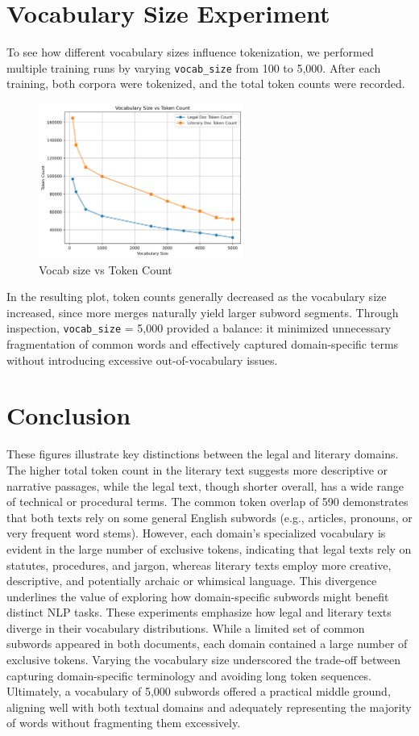 \documentclass[11pt]{article}
\begin{document}
\section{Vocabulary Size Experiment}
To see how different vocabulary sizes influence tokenization, we performed multiple training runs by varying \texttt{vocab\_size} from 100 to 5{,}000. After each training, both corpora were tokenized, and the total token counts were recorded.

\begin{figure}[htbp]
  \centering
  \includegraphics[width=0.6\textwidth]{plot.png}
  \caption{Vocab size vs Token Count}
  \label{fig:sample-png}
\end{figure}
In the resulting plot, token counts generally decreased as the vocabulary size increased, since more merges naturally yield larger subword segments. Through inspection, \texttt{vocab\_size} = 5{,}000 provided a balance: it minimized unnecessary fragmentation of common words and effectively captured domain-specific terms without introducing excessive out-of-vocabulary issues.

\section{Conclusion}
These figures illustrate key distinctions between the legal and literary domains. The higher total token count in the literary text suggests more descriptive or narrative passages, while the legal text, though shorter overall, has a wide range of technical or procedural terms. The common token overlap of 590 demonstrates that both texts rely on some general English subwords (e.g., articles, pronouns, or very frequent word stems). However, each domain's specialized vocabulary is evident in the large number of exclusive tokens, indicating that legal texts rely on statutes, procedures, and jargon, whereas literary texts employ more creative, descriptive, and potentially archaic or whimsical language. This divergence underlines the value of exploring how domain-specific subwords might benefit distinct NLP tasks.
These experiments emphasize how legal and literary texts diverge in their vocabulary distributions. While a limited set of common subwords appeared in both documents, each domain contained a large number of exclusive tokens. Varying the vocabulary size underscored the trade-off between capturing domain-specific terminology and avoiding long token sequences. Ultimately, a vocabulary of 5{,}000 subwords offered a practical middle ground, aligning well with both textual domains and adequately representing the majority of words without fragmenting them excessively.
\end{document}
